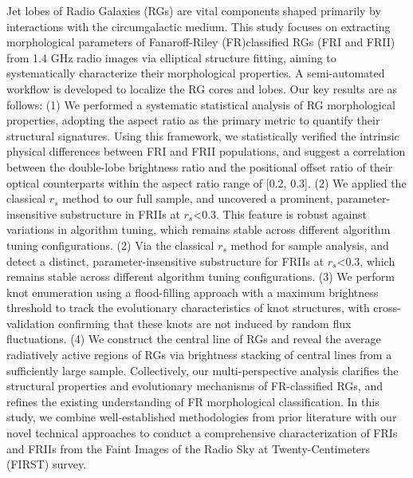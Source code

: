 \documentclass{aa}
\begin{document}
 \abstract
   {
   Jet lobes of Radio Galaxies (RGs) are vital components shaped primarily by interactions with the circumgalactic medium. This study focuses on extracting morphological parameters of Fanaroff-Riley (FR)\textemdash classified RGs (FRI and FRII) from 1.4 GHz radio images via elliptical structure fitting, aiming to systematically characterize their morphological properties. A semi-automated workflow is developed to localize the RG cores and lobes. 
    Our key results are as follows:
    (1) We performed a systematic statistical analysis of RG morphological properties, adopting the aspect ratio as the primary metric to quantify their structural signatures. Using this framework, we statistically verified the intrinsic physical differences between FRI and FRII populations, and suggest a correlation between the double-lobe brightness ratio and the positional offset ratio of their optical counterparts within the aspect ratio range of [0.2, 0.3].
    (2) We applied the classical $r_s$ method to our full sample, and uncovered a prominent, parameter-insensitive substructure in FRIIs at $r_s$<0.3. This feature is robust against variations in algorithm tuning, which remains stable across different algorithm tuning configurations.
    (2) Via the classical $r_s$ method for sample analysis, and detect a distinct, parameter-insensitive substructure for FRIIs at $r_s$<0.3, which remains stable across different algorithm tuning configurations.
    (3) We perform knot enumeration using a flood-filling approach with a maximum brightness threshold to track the evolutionary characteristics of knot structures, with cross-validation confirming that these knots are not induced by random flux fluctuations.
    (4) We construct the central line of RGs and reveal the average radiatively active regions of RGs via brightness stacking of central lines from a sufficiently large sample.
    Collectively, our multi-perspective analysis clarifies the structural properties and evolutionary mechanisms of FR-classified RGs, and refines the existing understanding of FR morphological classification. In this study, we combine well-established methodologies from prior literature with our novel technical approaches to conduct a comprehensive characterization of FRIs and FRIIs from the Faint Images of the Radio Sky at Twenty-Centimeters (FIRST) survey.
    
   }
 
  

\end{document}
